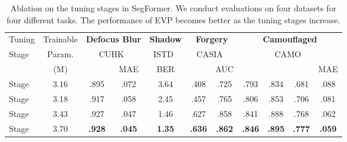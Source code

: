 \begin{table*}[!t]
\centering
{
\begin{tabular}{l||c|cc|c|cc|cccc}
\toprule
Tuning & Trainable & \multicolumn{2}{c|}{\textbf{Defocus Blur}} & \textbf{Shadow} & \multicolumn{2}{c|}{\textbf{Forgery }} & \multicolumn{4}{c}{\textbf{Camouflaged}}\\
      Stage & Param.&  \multicolumn{2}{c|}{CUHK~\cite{shi2014discriminative}} & ISTD~\cite{wang2018stacked}& \multicolumn{2}{c|}{CASIA~\cite{dong2013casia}} & \multicolumn{4}{c}{CAMO~\cite{le2019anabranch}}\\ 
      & (M) & & MAE       & BER     &  & AUC   &  &    &   & MAE    \\ \hline
Stage & 3.16 & .895 & .072 & 3.64  & .408 & .725  & .793 & .834 & .681 & .088 \\ 
Stage & 3.18 & .917 & .058 & 2.45  & .457 & .765  & .806 & .853 & .706 & .081 \\ 
Stage & 3.43 & .927   & .047  & 1.46 & .627 & .858 & .841 & .888 & .768 & .062 \\
Stage & 3.70 & \bf.928  & \bf.045  & \bf1.35 & \bf.636   & \bf.862 & \bf.846 & \bf.895 & \bf.777 & \bf.059 \\ 
\bottomrule
\end{tabular}}
\caption{Ablation on the tuning stages in SegFormer. We conduct evaluations on four datasets for four different tasks. The performance of EVP becomes better as the tuning stages increase.}
\label{tab:tuning_stage}
\end{table*}




